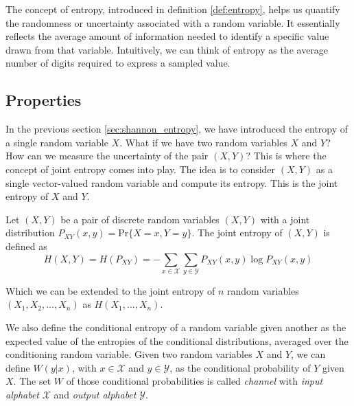 \noindent The concept of entropy, introduced in definition \ref{def:entropy}, helps us quantify the randomness or uncertainty associated with a random variable. It essentially reflects the average amount of information needed to identify a specific value drawn from that variable. Intuitively, we can think of entropy as the average number of digits required to express a sampled value.



\subsection{Properties}
In the previous section \ref{sec:shannon_entropy}, we have introduced the entropy of a single random variable $X$. What if we have two random variables $X$ and $Y$? How can we measure the uncertainty of the pair $(X,Y)$? This is where the concept of joint entropy comes into play. The idea is to consider $(X,Y)$ as a single vector-valued random variable and compute its entropy. This is the joint entropy of $X$ and $Y$.

\begin{definition}\label{def:joint_entropy}
    Let $(X,Y)$ be a pair of discrete random variables $(X,Y)$ with a joint distribution $P_{XY}(x,y) = \text{Pr}\{X=x,Y=y\}$. The joint entropy of $(X,Y)$ is defined as
    \begin{equation}\label{eq:joint_entropy}
        H(X,Y) = H(P_{XY}) = -\sum_{x\in\mathcal{X}}\sum_{y\in\mathcal{Y}} P_{XY}(x,y)\log P_{XY}(x,y)
    \end{equation}
\end{definition}
\noindent Which we can be extended to the joint entropy of $n$ random variables $(X_1,X_2,\ldots,X_n)$ as $H(X_1,\ldots, X_n)$. \vspace*{0.4cm}

\noindent We also define the conditional entropy of a random variable given another as the expected value of the entropies of the conditional distributions, averaged over the conditioning random variable. Given two random variables $X$ and $Y$, we can define $W(y|x)$, with $x \in \mathcal{X}$ and $y \in \mathcal{Y}$, as the conditional probability of $Y$ given $X$. The set $W$ of those conditional probabilities is called \emph{channel} with \emph{input alphabet} $\mathcal{X}$ and \emph{output alphabet} $\mathcal{Y}$.

